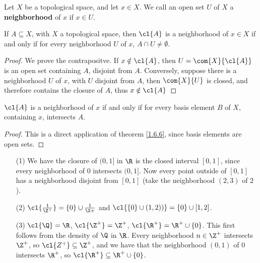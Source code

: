 \begin{definition}
    Let $X$ be a topological space, and let  $x \in X$. We call an open set  $U$
    of  $X$ a \textbf{neighborhood} of  $x$ if  $x \in U$.
\end{definition}

\begin{theorem}\label{1.6.6}
    If $A \subseteq X$, with  $X$ a topological space, then  $\cl{A}$ is a
    neighborhood of  $x \in X$ if and only if for every neighborhood  $U$ of
    $x$,  $A \cap U \neq \emptyset$.
\end{theorem}
\begin{proof}
    We prove the contrapositve. If $x \notin \cl{A}$, then
    $U=\com{X}{\cl{A}}$ is an open set containing  $A$, disjoint from
    $A$. Conversely, suppose there is a neighborhood $U$ of $x$, with $U$
    disjoint from  $A$, then  $\com{X}{U}$ is closed, and therefore contains the
    closure of  $A$, thus  $x \notin \cl{A}$
\end{proof}
\begin{corollary}
    $\cl{A}$ is a neighborhood of  $x$ if and only if for every basis element
    $B$ of  $X$, containing  $x$, intersects  $A$.
\end{corollary}
\begin{proof}
    This is a direct application of theorem \ref{1.6.6}, since basis elements
    are open sets.
\end{proof}

\begin{example}
    \begin{enumerate}
        \item[(1)] We have the closure of $(0,1]$ in  $\R$ is the closed interval
            $[0,1]$, since every neighborhood of $0$ intersects  $(0,1]$. Now
            every point outside of  $[0,1]$ has a neighborhood disjoint from
            $[0,1]$  (take the neighborhood $(2,3)$ of  $2$).

        \item[(2)] $\cl{\frac{1}{\Z^+}}=\{0\} \cup \frac{1}{\Z+}$ and $\cl{\{0\} \cup
            (1,2))}=\{0\} \cup [1,2]$.

        \item[(3)] $\cl{\Q}=\R$,  $\cl{\Z^+}=\Z^+$,  $\cl{\R^+}=\R^+ \cup \{0\}$.
            This first follows from the density of $\Q$ in  $\R$. Every
            neighborhood  $n \in \Z^+$ intersects  $\Z^+$, so  $\cl{Z^+}
            \subseteq \Z^+$, and we have that the neighborhood  $(0,1)$ of  $0$
            intersects $\R^+$, so  $\cl{\R^+} \subseteq \R^+ \cup \{0\}$.
    \end{enumerate}
\end{example}

